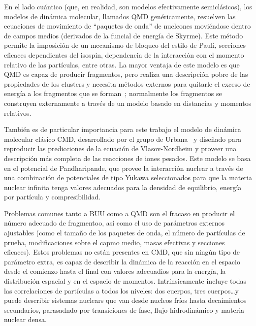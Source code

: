 En el lado cuántico (que, en realidad, son modelos efectivamente semiclásicos), los modelos de dinámica molecular, llamados QMD genéricamente, resuelven las ecuaciones de movimiento de ``paquetes de onda'' de nucleones moviéndose dentro de campos medios (derivados de la funcial de energía de Skyrme).
Este método permite la imposición de un mecanismo de bloqueo del estilo de Pauli, secciones eficaces dependientes del isospin, dependencia de la interacción con el momento relativo de las partículas, entre otras.
La mayor ventaja de este modelo es que QMD es capaz de producir fragmentos, pero realiza una descripción pobre de las propiedades de los clusters y necesita métodos externos para quitarle el exceso de energía a los fragmentos que se forman~\cite{polanski_development_2005};
normalmente los fragmentos se construyen externamente a través de un modelo basado en distancias y momentos relativos.

También es de particular importancia para este trabajo el modelo de dinámica molecular clásico CMD, desarrollado por el grupo de Urbana~\cite{lenk_accuracy_1990} y diseñado para reproducir las predicciones de la ecuación de Vlasov-Nordheim y proveer una descripción más completa de las reacciones de iones pesados.
Este modelo se basa en el potencial de Pandharipande, que provee la interacción nuclear a través de una combinación de potenciales de tipo Yukawa seleccionados para que la materia nuclear infinita tenga valores adecuados para la densidad de equilibrio, energía por partícula y compresibilidad.

Problemas comunes tanto a BUU como a QMD son el fracaso en producir el número adecuado de fragmentoo, así como el uso de parámetros externos ajustables (como el tamaño de los paquetes de onda, el número de partículas de prueba, modificaciones sobre el capmo medio, masas efectivas y secciones eficaces).
Estos problemas no están presentes en CMD, que sin ningún tipo de parámetro extra, es capaz de describir la dinámica de la reacción en el espacio desde el comienzo hasta el final con valores adecuadios para la energía, la distribución espacial y en el espacio de momentos.
Intrínsicamente incluye todas las correlaciones de partículas a todos los niveles: dos cuerpos, tres cuerpos\ldots y puede describir sistemas nuclears que van desde nucleos fríos hasta decaimientos secundarios, parasadndo por transiciones de fase, flujo hidrodinámico y materia nuclear densa.

